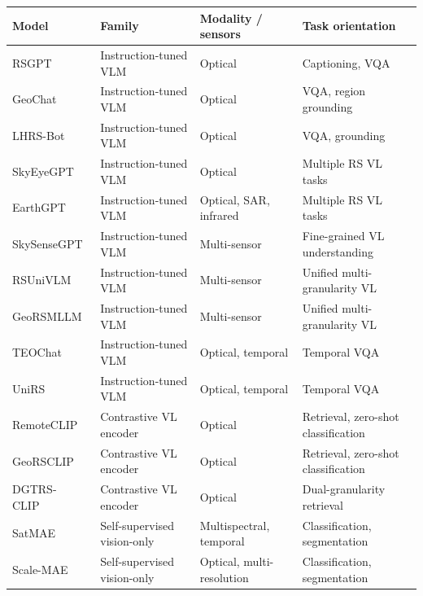 \begin{table}[h]
\centering
\small
\begin{tabularx}{\textwidth}{l l X X}
\hline
\textbf{Model} & \textbf{Family} & \textbf{Modality / sensors} & \textbf{Task orientation} \\
\hline
RSGPT~\cite{hu2023rsgpt} & Instruction-tuned VLM & Optical & Captioning, VQA \\
GeoChat~\cite{kuckreja2024geochat} & Instruction-tuned VLM & Optical & VQA, region grounding \\
LHRS-Bot~\cite{muhtar2025lhrsbot} & Instruction-tuned VLM & Optical & VQA, grounding \\
SkyEyeGPT~\cite{zhan2025skyeyegpt} & Instruction-tuned VLM & Optical & Multiple RS VL tasks \\
EarthGPT~\cite{zhang2024earthgpt} & Instruction-tuned VLM & Optical, SAR, infrared & Multiple RS VL tasks \\
SkySenseGPT~\cite{luo2024skysensegptfinegrainedinstructiontuning} & Instruction-tuned VLM & Multi-sensor & Fine-grained VL understanding \\
RSUniVLM~\cite{liu2024rsunivlmunifiedvisionlanguage} & Instruction-tuned VLM & Multi-sensor & Unified multi-granularity VL \\
GeoRSMLLM~\cite{zhang2025georsmllmmultimodallargelanguage} & Instruction-tuned VLM & Multi-sensor & Unified multi-granularity VL \\
TEOChat~\cite{irvin2025teochatlargevisionlanguageassistant} & Instruction-tuned VLM & Optical, temporal & Temporal VQA \\
UniRS~\cite{li2024unirsunifyingmultitemporalremote} & Instruction-tuned VLM & Optical, temporal & Temporal VQA \\
\hline
RemoteCLIP~\cite{liu2024remoteclip} & Contrastive VL encoder & Optical & Retrieval, zero-shot classification \\
GeoRSCLIP~\cite{zhang2024rs5m} & Contrastive VL encoder & Optical & Retrieval, zero-shot classification \\
DGTRS-CLIP~\cite{chen2025dgtrsddgtrsclipdualgranularity} & Contrastive VL encoder & Optical & Dual-granularity retrieval \\
\hline
SatMAE~\cite{cong2022satmae} & Self-supervised vision-only & Multispectral, temporal & Classification, segmentation \\
Scale-MAE~\cite{reed2023scalemae} & Self-supervised vision-only & Optical, multi-resolution & Classification, segmentation \\

\end{tabularx}
\end{table}
